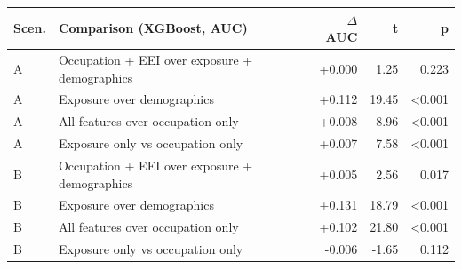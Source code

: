\begin{tabular}{llrrr}
\toprule
Scen. & Comparison (XGBoost, AUC) & $\Delta$AUC & t & p \\
\midrule
A & Occupation + EEI over exposure + demographics & +0.000 & 1.25 & 0.223 \\
A & Exposure over demographics & +0.112 & 19.45 & <0.001 \\
A & All features over occupation only & +0.008 & 8.96 & <0.001 \\
A & Exposure only vs occupation only & +0.007 & 7.58 & <0.001 \\
\midrule
B & Occupation + EEI over exposure + demographics & +0.005 & 2.56 & 0.017 \\
B & Exposure over demographics & +0.131 & 18.79 & <0.001 \\
B & All features over occupation only & +0.102 & 21.80 & <0.001 \\
B & Exposure only vs occupation only & -0.006 & -1.65 & 0.112 \\
\bottomrule
\end{tabular}
